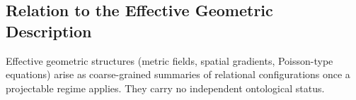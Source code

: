 \subsection{Relation to the Effective Geometric Description}
\label{subsec:relation-to-the-effective-geometric-description}

Effective geometric structures (metric fields, spatial gradients,
Poisson-type equations) arise as coarse-grained summaries of relational
configurations once a projectable regime applies.
They carry no independent ontological status.
